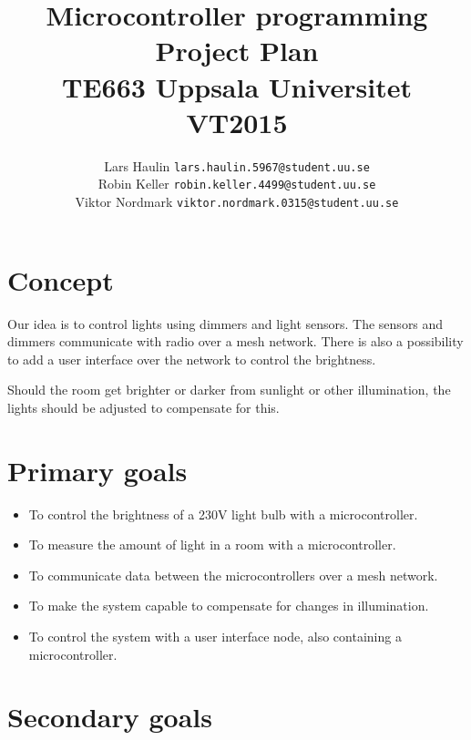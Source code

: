 \documentclass[11pt]{article}
\begin{document}
	\title{Microcontroller programming \\
		Project Plan\\
		TE663 Uppsala Universitet VT2015}
	\date{}
	\author{}
	\author{Lars Haulin \texttt{lars.haulin.5967@student.uu.se}\\
		Robin Keller \texttt{robin.keller.4499@student.uu.se}\\
		Viktor Nordmark \texttt{viktor.nordmark.0315@student.uu.se}}
	\maketitle
	
	\section{Concept}
	
	Our idea is to control lights using dimmers and light sensors.
	The sensors and dimmers communicate with radio over a mesh network.
	There is also a possibility to add a user interface over the network to control
	the brightness.
	
	Should the room get brighter or darker from sunlight or other illumination,
	the lights should be adjusted to compensate for this.
	
	\section{Primary goals}
	
	\begin{itemize}
		\item To control the brightness of a 230V light bulb with a microcontroller.
		\item To measure the amount of light in a room with a microcontroller.
		\item To communicate data between the microcontrollers over a mesh network.
		\item To make the system capable to compensate for changes in illumination.
		\item To control the system with a user interface node, also containing
		a microcontroller.
	\end{itemize}
	
	\section{Secondary goals}
	
	
	
\end{document}
